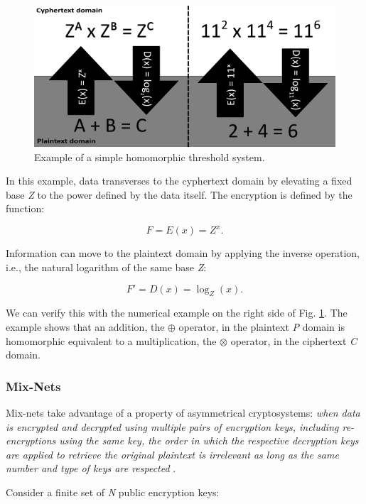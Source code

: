 \documentclass[../access.tex]{subfiles}
\begin{document}
                \begin{figure}[h!]
                    \centering
                    \includegraphics[width=\columnwidth]{Images/almei2.png}
                    \caption{Example of a simple homomorphic threshold system.}
                    \label{fig:homomorphism}
                \end{figure}

                In this example, data transverses to the cyphertext domain by elevating a fixed base \textit{Z} to the power defined by the data itself. The encryption is defined by the function: 
                
                \begin{equation}
                    F = E(x) = Z^x.
                \end{equation} 
                
                Information can move to the plaintext domain by applying the inverse operation, i.e., the natural logarithm of the same base \textit{Z}: 
                
                \begin{equation}
                    F' = D(x) = \log_Z(x).
                \end{equation} 
                
                We can verify this with the numerical example on the right side of Fig. \ref{fig:homomorphism}. The example shows that an addition, the $\oplus$ operator, in the plaintext \textit{P} domain is homomorphic equivalent to a multiplication, the $\otimes$ operator, in the ciphertext \textit{C} domain.

        \subsubsection{Mix-Nets}
            \label{centralized_mix_nets}
            Mix-nets take advantage of a property of asymmetrical cryptosystems: \textit{when data is encrypted and decrypted using multiple pairs of encryption keys, including re-encryptions using the same key, the order in which the respective decryption keys are applied to retrieve the original plaintext is irrelevant as long as the same number and type of keys are respected} \cite{Juels2010} \cite{Chaum1982}.
            \par
            Consider a finite set of \textit{N} public encryption keys: 
\end{document}
